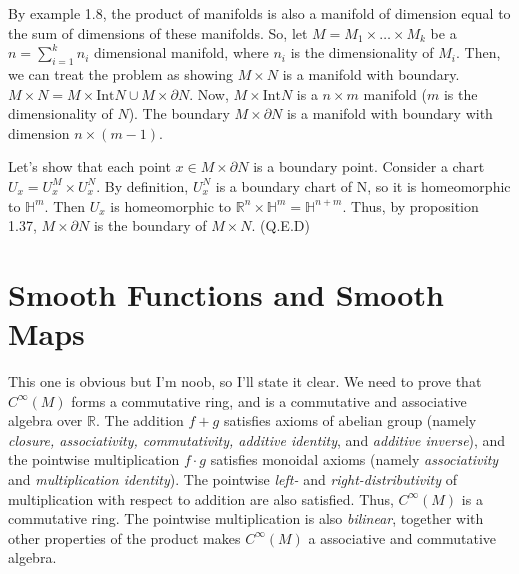 \documentclass[a4paper]{article}
\begin{document}
\begin{exercise}[1-12]
    By example 1.8, the product of manifolds is also a manifold of dimension
    equal to the sum of dimensions of these manifolds. So, let $M = M_1 \times \dots \times M_k$
    be a $n = \sum_{i=1}^k n_i$ dimensional manifold, where $n_i$ is the dimensionality
    of $M_i$. Then, we can treat the problem as showing $M \times N$ is a manifold with
    boundary. $M \times N = M\times \text{Int}N \cup M\times \partial N$. Now,
    $M \times \text{Int}N$ is a $n\times m$ manifold ($m$ is the dimensionality of $N$).
    The boundary $M \times \partial N$ is a manifold with boundary with dimension
    $n \times (m-1)$.

    Let's show that each point $x \in M\times \partial N$ is a boundary point.
    Consider a chart $U_x = U^M_x \times U^N_x$. By definition, $U^N_x$ is a
    boundary chart of N, so it is homeomorphic to $\mathbb{H}^m$. Then $U_x$ is
    homeomorphic to $\mathbb{R}^n \times \mathbb{H}^m = \mathbb{H}^{n+m}$. Thus,
    by proposition 1.37, $M \times \partial N$ is the boundary of $M \times N$. (Q.E.D)
\end{exercise}




\section{Smooth Functions and Smooth Maps}

\begin{note}[on ex. 2.1]
    This one is obvious but I'm noob, so I'll state it clear. We need to prove that $C^\infty(M)$ forms a commutative ring, and is a commutative
    and associative algebra over $\mathbb{R}$. The addition $f+g$ satisfies
    axioms of abelian group (namely \textit{closure, associativity, commutativity,
    additive identity}, and \textit{additive inverse}), and the pointwise multiplication
    $f \cdot g$ satisfies monoidal axioms (namely \textit{associativity} and
    \textit{multiplication identity}). The pointwise  \textit{left-} and
    \textit{right-distributivity} of multiplication with respect to addition are also
    satisfied. Thus, $C^\infty(M)$ is a commutative ring. The pointwise multiplication
    is also \textit{bilinear}, together with other properties of the product
    makes $C^\infty(M)$ a associative and commutative algebra.
\end{note}
\end{document}

